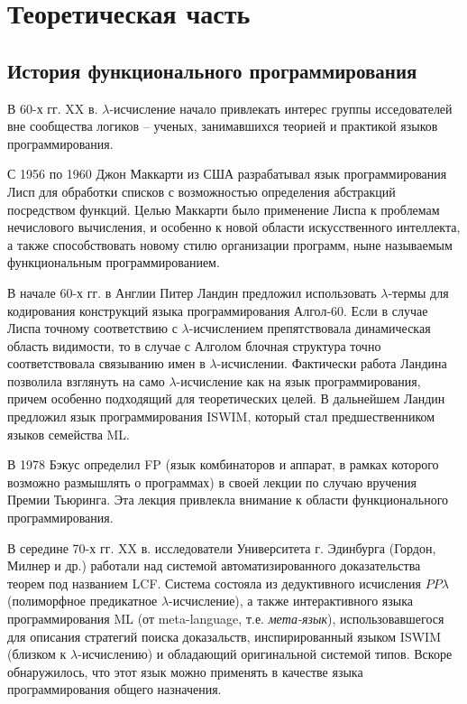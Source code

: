 \section{Теоретическая часть}

\subsection{История функционального программирования}
\label{sec:hist}

В 60-х гг. XX в. $\lambda$-исчисление начало привлекать интерес группы исседователей вне сообщества логиков -- ученых, занимавшихся теорией и практикой языков программирования.

С 1956 по 1960 Джон Маккарти из США разрабатывал язык программирования Лисп \cite{mccarthy1965lisp} для обработки списков с возможностью определения абстракций посредством функций. Целью Маккарти было применение Лиспа к проблемам нечислового вычисления, и особенно к новой области искусственного интеллекта, а также способствовать новому стилю организации программ, ныне называемым функциональным программированием.

В начале 60-х гг. в Англии Питер Ландин предложил использовать $\lambda$-термы для кодирования конструкций языка программирования Алгол-60. \cite{landin1965correspondence} Если в случае Лиспа точному соответствию с $\lambda$-исчислением препятствовала динамическая область видимости, то в случае с Алголом блочная структура точно соответствовала связыванию имен в $\lambda$-исчислении. Фактически работа Ландина позволила взглянуть на само $\lambda$-исчисление как на язык программирования, причем особенно подходящий для теоретических целей. В дальнейшем Ландин предложил язык программирования ISWIM, \cite{landin1966next} который стал предшественником языков семейства ML.

В 1978 Бэкус определил FP (язык комбинаторов и аппарат, в рамках которого возможно размышлять о программах) в своей лекции по случаю вручения Премии Тьюринга. \cite{backus2007can} Эта лекция привлекла внимание к области функционального программирования.

В середине 70-х гг. XX в. исследователи Университета г. Эдинбурга (Гордон, Милнер и др.) работали над системой автоматизированного доказательства теорем под названием LCF. \cite{gordon1979edinburgh} Система состояла из дедуктивного исчисления $PP\lambda$ (полиморфное предикатное $\lambda$-исчисление), а также интерактивного языка программирования ML (от meta-language, т.е. \textit{мета-язык}), использовавшегося для описания стратегий поиска доказальств, инспирированный языком ISWIM (близком к $\lambda$-исчислению) и обладающий оригинальной системой типов. Вскоре обнаружилось, что этот язык можно применять в качестве языка программирования общего назначения.

